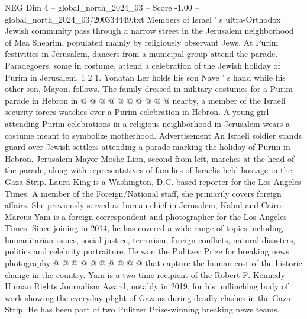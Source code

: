 \begin{textsample}{NEG Dim 4 – global\_north\_2024\_03 – Score -1.00 – global\_north\_2024\_03/200334449.txt}
Members of Israel ' s ultra-Orthodox Jewish community pass through a narrow street in the Jerusalem neighborhood of Mea Shearim, populated mainly by religiously observant Jews.
At Purim festivities in Jerusalem, dancers from a municipal group attend the parade.
Paradegoers, some in costume, attend a celebration of the Jewish holiday of Purim in Jerusalem. 1 2 1.
Yonatan Ler holds his son Nave ' s hand while his other son, Mayon, follows.
The family dressed in military costumes for a Purim parade in Hebron in @ @ @ @ @ @ @ @ @ @ nearby, a member of the Israeli security forces watches over a Purim celebration in Hebron.
A young girl attending Purim celebrations in a religious neighborhood in Jerusalem wears a costume meant to symbolize motherhood.
Advertisement An Israeli soldier stands guard over Jewish settlers attending a parade marking the holiday of Purim in Hebron.
Jerusalem Mayor Moshe Lion, second from left, marches at the head of the parade, along with representatives of families of Israelis held hostage in the Gaza Strip.
Laura King is a Washington, D.C.-based reporter for the Los Angeles Times.
A member of the Foreign/National staff, she primarily covers foreign affairs.
She previously served as bureau chief in Jerusalem, Kabul and Cairo.
Marcus Yam is a foreign correspondent and photographer for the Los Angeles Times.
Since joining in 2014, he has covered a wide range of topics including humanitarian issues, social justice, terrorism, foreign conflicts, natural disasters, politics and celebrity portraiture.
He won the Pulitzer Prize for breaking news photography @ @ @ @ @ @ @ @ @ @ that capture the human cost of the historic change in the country.
Yam is a two-time recipient of the Robert F.
Kennedy Human Rights Journalism Award, notably in 2019, for his unflinching body of work showing the everyday plight of Gazans during deadly clashes in the Gaza Strip.
He has been part of two Pulitzer Prize-winning breaking news teams.

\end{textsample}
